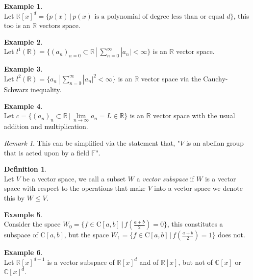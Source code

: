 \documentclass[12pt]{article}
\newcommand{\double}{\hspace{2pt}}
\theoremstyle{definition}
\newtheorem{definition}[theorem]{Definition}
\newtheorem*{example}{Example}
\theoremstyle{remark}
\newtheorem*{remark}{Remark}
\theoremstyle{plain}
\begin{document}
\begin{example}\leavevmode \\
    Let $\mathbb{R}[x]^d=\{p(x) \double | \double p(x) \text{ is a polynomial of degree less than or equal }d \}$, this too is an $\mathbb{R}$ vectors space.
\end{example}
\begin{example}\leavevmode \\
    Let $ l^1(\mathbb{R})=\{ (a_n)_{n=0} \subset \mathbb{R} \double | \double \sum\limits_{n=0}^\infty |a_n|< \infty \} $ is an $\mathbb{R}$ vector space.
\end{example}
\begin{example}\leavevmode \\
    Let $l^2(\mathbb{R})=\{ a_n \double | \double \sum\limits_{n=0}^\infty |a_n|^2 <\infty \}$ is an $\mathbb{R}$ vector space via the Cauchy-Schwarz inequality.
\end{example}
\begin{example}\leavevmode \\
    Let $c=\{ (a_n)_n \subset \mathbb{R}\double | \double \lim\limits_{n\to \infty}a_n= L\in \mathbb{R} \}$ is an $\mathbb{R}$ vector space with the usual addition and multiplication.
\end{example}
\begin{remark}
    This can be simplified via the statement that, "$V$ is an abelian group that is acted upon by a field $\mathbb{F}$".
\end{remark}
\begin{definition}\leavevmode \\
    Let $V$ be a vector space, we call a subset $W$ a \textit{vector subspace} if $W$ is a vector space with respect to the operations that make $V$ into a vector space we denote this by $W\leq V$.
\end{definition}
\begin{example}\leavevmode \\
    Consider the space $W_0=\{ f\in \mathrm{C}[a,b] \double | \double f(\frac{a+b}{2})=0\}$, this constitutes a subspace of $\mathrm{C}[a,b]$, but the space $W_1=\{ f\in \mathrm{C}[a,b] \double | \double f(\frac{a+b}{2})=1\}$ does not.
\end{example}
\begin{example}\leavevmode \\
   Let $\mathbb{R}[x]^{d-1}$ is a vector subspace of $\mathbb{R}[x]^d$ and of $\mathbb{R}[x]$, but not of $\mathbb{C}[x]$ or $\mathbb{C}[x]^d$.
\end{example}
\end{document}
